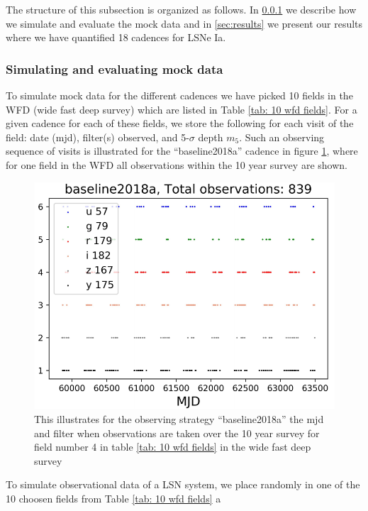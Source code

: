 The structure of this subsection is organized as follows. In
\ref{sec:simulation of mock data} we describe how we simulate and
evaluate the mock data and in \ref{sec:results} we present our results
where we have quantified 18 cadences for LSNe Ia.

\subsubsection{Simulating and evaluating mock data}
\label{sec:simulation of mock data}
To simulate mock data for the different cadences we have picked 10
fields in the WFD (wide fast deep survey) which are listed in Table
\ref{tab: 10 wfd fields}. For a given cadence for each of these
fields, we store the following for each visit of the field: date
(mjd), filter(s) observed, and 5-$\sigma$ depth $m_5$. Such an
observing sequence of visits is illustrated for the ``baseline2018a''
cadence in figure \ref{fig:observation patter LSST 10 year survey},
where for one field in the WFD all observations within the 10 year
survey are shown. 
%
\begin{figure}
\centering
\includegraphics[scale=0.7]{figures/sl_field_number3_baseline2018a_Daniel.pdf}
\caption{This illustrates for the observing strategy ``baseline2018a'' the mjd and filter when observations are taken over the 10 year survey for field number 4 in table \ref{tab: 10 wfd fields} in the wide fast deep survey}
\label{fig:observation patter LSST 10 year survey}
\end{figure}
%
To simulate observational data of a LSN system, we place randomly in
one of the 10 choosen fields from Table \ref{tab: 10 wfd fields} a
